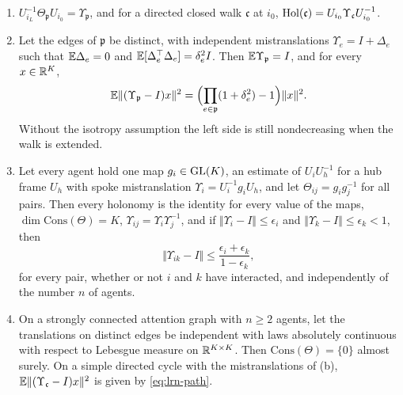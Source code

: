 \begin{theorem}\label{thm:lrn-path}
\begin{enumerate}
\item[(a)] $U_{i_L}^{-1}\Theta_{\mathfrak p}U_{i_0}=\Upsilon_{\mathfrak p}$, and for a directed closed walk $\mathfrak c$ at $i_0$, $\operatorname{Hol}(\mathfrak c)=U_{i_0}\Upsilon_{\mathfrak c}U_{i_0}^{-1}$.
\item[(b)] Let the edges of $\mathfrak p$ be distinct, with independent mistranslations $\Upsilon_e=I+\Delta_e$ such that $\mathbb{E}\Delta_e=0$ and $\mathbb{E}[\Delta_e^\top\Delta_e]=\delta_e^2I$. Then $\mathbb{E}\Upsilon_{\mathfrak p}=I$, and for every $x\in\mathbb{R}^K$,
\begin{equation}\label{eq:lrn-path}
\mathbb{E}\Vert(\Upsilon_{\mathfrak p}-I)x\Vert^2=\Bigl(\prod_{e\in\mathfrak p}(1+\delta_e^2)-1\Bigr)\Vert x\Vert^2.
\end{equation}
Without the isotropy assumption the left side is still nondecreasing when the walk is extended.
\item[(c)] Let every agent hold one map $g_i\in\mathrm{GL}(K)$, an estimate of $U_iU_h^{-1}$ for a hub frame $U_h$ with spoke mistranslation $\Upsilon_i=U_i^{-1}g_iU_h$, and let $\Theta_{ij}=g_ig_j^{-1}$ for all pairs. Then every holonomy is the identity for every value of the maps, $\dim\mathrm{Cons}(\Theta)=K$, $\Upsilon_{ij}=\Upsilon_i\Upsilon_j^{-1}$, and if $\Vert\Upsilon_i-I\Vert\le\epsilon_i$ and $\Vert\Upsilon_k-I\Vert\le\epsilon_k<1$, then
\begin{equation}\label{eq:lrn-zero-shot}
\Vert\Upsilon_{ik}-I\Vert\le\frac{\epsilon_i+\epsilon_k}{1-\epsilon_k},
\end{equation}
for every pair, whether or not $i$ and $k$ have interacted, and independently of the number $n$ of agents.
\item[(d)] On a strongly connected attention graph with $n\ge2$ agents, let the translations on distinct edges be independent with laws absolutely continuous with respect to Lebesgue measure on $\mathbb{R}^{K\times K}$. Then $\mathrm{Cons}(\Theta)=\{0\}$ almost surely. On a simple directed cycle with the mistranslations of (b), $\mathbb{E}\Vert(\Upsilon_{\mathfrak c}-I)x\Vert^2$ is given by \cref{eq:lrn-path}.
\end{enumerate}
\end{theorem}

